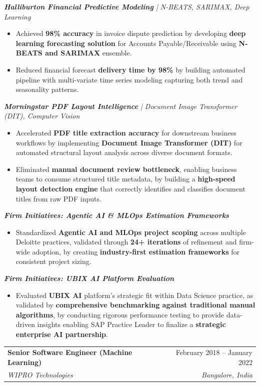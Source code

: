 \documentclass[letterpaper,10pt]{article}
\makeatletter
\newcommand{\resumeItem}[1]{
  \item\small{
    {#1 \vspace{-2pt}}
  }
}
\newcommand{\resumeSubheading}[4]{
  \vspace{-2pt}\item
    \begin{tabular*}{0.97\textwidth}[t]{l@{\extracolsep{\fill}}r}
      \textbf{#1} & #2 \\
      \textit{\small#3} & \textit{\small #4} \\
    \end{tabular*}\vspace{-7pt}
}
\newcommand{\resumeItemListStart}{\begin{itemize}}
\newcommand{\resumeItemListEnd}{\end{itemize}\vspace{-5pt}}
\makeatother
\begin{document}
      \vspace{12pt}
      \textit{\small\textbf{Halliburton Financial Predictive Modeling} | N-BEATS, SARIMAX, Deep Learning}
      \resumeItemListStart
        \resumeItem{Achieved \textbf{98\% accuracy} in invoice dispute prediction by developing \textbf{deep learning forecasting solution} for Accounts Payable/Receivable using \textbf{N-BEATS and SARIMAX} ensemble.}
        \resumeItem{Reduced financial forecast \textbf{delivery time by 98\%} by building automated pipeline with multi-variate time series modeling capturing both trend and seasonality patterns.}
      \resumeItemListEnd

      \vspace{12pt}
      \textit{\small\textbf{Morningstar PDF Layout Intelligence} | Document Image Transformer (DIT), Computer Vision}
      \resumeItemListStart
        \resumeItem{Accelerated \textbf{PDF title extraction accuracy} for downstream business workflows by implementing \textbf{Document Image Transformer (DIT)} for automated structural layout analysis across diverse document formats.}
        \resumeItem{Eliminated \textbf{manual document review bottleneck}, enabling business teams to consume structured title metadata, by building a \textbf{high-speed layout detection engine} that correctly identifies and classifies document titles from raw PDF inputs.}
      \resumeItemListEnd

      \vspace{12pt}
      \textit{\small\textbf{Firm Initiatives: Agentic AI \& MLOps Estimation Frameworks}}
      \resumeItemListStart
        \resumeItem{Standardized \textbf{Agentic AI and MLOps project scoping} across multiple Deloitte practices, validated through \textbf{24+ iterations} of refinement and firm-wide adoption, by creating \textbf{industry-first estimation frameworks} for consistent project sizing.}
      \resumeItemListEnd

      \vspace{12pt}
      \textit{\small\textbf{Firm Initiatives: UBIX AI Platform Evaluation}}
      \resumeItemListStart
        \resumeItem{Evaluated \textbf{UBIX AI} platform's strategic fit within Data Science practice, as validated by \textbf{comprehensive benchmarking against traditional manual algorithms}, by conducting rigorous performance testing to provide data-driven insights enabling SAP Practice Leader to finalize a \textbf{strategic enterprise AI partnership}.}
      \resumeItemListEnd

      \vspace{12pt}
      \vspace{12pt}
    \resumeSubheading
      {Senior Software Engineer (Machine Learning)}{February 2018 -- January 2022}
      {WIPRO Technologies}{Bangalore, India}
      
\end{document}
